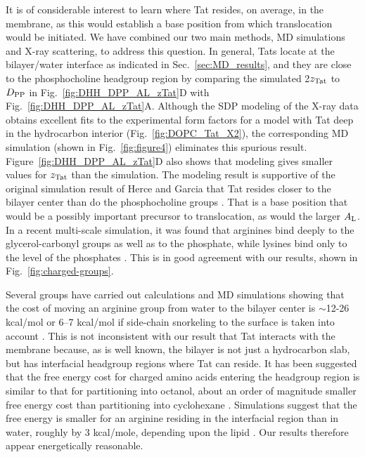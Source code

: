It is of considerable interest to learn where Tat resides, on average, in the 
membrane, as this would establish a base position from which translocation 
would be initiated. We have combined our two main methods, MD simulations and 
X-ray scattering, to address this question. In general, Tats locate at the 
bilayer/water interface as indicated in Sec.~\ref{sec:MD_results}, 
and they are close to 
the phosphocholine headgroup region by comparing the simulated 2$z_\textrm{Tat}$
to $D_\textrm{PP}$ in Fig.~\ref{fig:DHH_DPP_AL_zTat}D with Fig.~\ref{fig:DHH_DPP_AL_zTat}A. 
Although the SDP modeling of the X-ray data obtains 
excellent fits to the experimental form factors for a model with Tat deep in 
the hydrocarbon interior (Fig.~\ref{fig:DOPC_Tat_X2}), 
the corresponding MD simulation 
(shown in Fig.~\ref{fig:figure4}) eliminates this spurious result. 
Figure~\ref{fig:DHH_DPP_AL_zTat}D also shows that modeling gives smaller values 
for $z_\textrm{Tat}$ than the simulation. 
The modeling result is supportive of the original simulation result of 
Herce and Garcia that Tat resides closer to the bilayer center than do the 
phosphocholine groups \cite{Herce07}. That is a base position that would be a
possibly important precursor to translocation, as would the larger $A_\textrm{L}$.
In a recent multi-scale simulation, it was found that arginines bind deeply to 
the glycerol-carbonyl groups as well as to the phosphate, while lysines bind 
only to the level of the phosphates \cite{Wu13}.  
This is in good agreement with our results, shown in Fig.~\ref{fig:charged-groups}.

Several groups have carried out calculations and MD simulations showing that 
the cost of moving an arginine group from water to the bilayer center is 
$\sim$12-26 kcal/mol \cite{Johansson09,Li08,Vorobyov08,MacCallum08} 
or 6--7 kcal/mol if side-chain snorkeling to the surface is taken into 
account \cite{Schow11}. This is not inconsistent with our result that Tat 
interacts with the membrane because, as is well known, the bilayer is not
just a hydrocarbon slab, but has interfacial headgroup regions where Tat can 
reside. It has been suggested that the free energy cost for charged amino acids 
entering the headgroup region is similar to that for partitioning into octanol, 
about an order of magnitude smaller free energy cost than partitioning into 
cyclohexane \cite{Wimley96_BC,Wimley96_NSB,Roux07}. 
Simulations suggest that the free energy is smaller for an arginine residing 
in the interfacial region than in water, roughly by 3 kcal/mole, depending
upon the lipid \cite{Johansson09,Roux07}. 
Our results therefore appear energetically reasonable.

